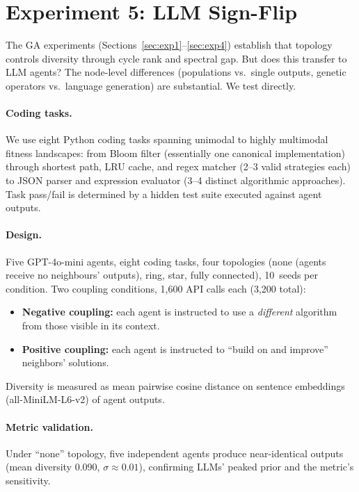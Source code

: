 \documentclass[runningheads]{llncs}
\begin{document}
\section{Experiment 5: LLM Sign-Flip}
\label{sec:exp5}

The GA experiments (Sections~\ref{sec:exp1}--\ref{sec:exp4}) establish
that topology controls diversity through cycle rank and spectral gap.
But does this transfer to LLM agents? The node-level differences
(populations vs.\ single outputs, genetic operators vs.\ language
generation) are substantial. We test directly.

\paragraph{Coding tasks.}
We use eight Python coding tasks spanning unimodal to highly multimodal fitness landscapes: from Bloom filter (essentially one canonical implementation) through shortest path, LRU cache, and regex matcher (2--3 valid strategies each) to JSON parser and expression evaluator (3--4 distinct algorithmic approaches). Task pass/fail is determined by a hidden test suite executed against agent outputs.

\paragraph{Design.}
Five GPT-4o-mini agents, eight coding tasks, four topologies (none
(agents receive no neighbours' outputs), ring, star, fully connected),
10~seeds per condition. Two coupling conditions, 1,600 API calls each
(3,200 total):

\begin{itemize}[nosep]
  \item \textbf{Negative coupling:} each agent is instructed to use a
    \emph{different} algorithm from those visible in its context.
  \item \textbf{Positive coupling:} each agent is instructed to
    ``build on and improve'' neighbors' solutions.
\end{itemize}

\noindent
Diversity is measured as mean pairwise cosine distance on sentence
embeddings (all-MiniLM-L6-v2) of agent outputs.

\paragraph{Metric validation.}
Under ``none'' topology, five independent agents produce
near-identical outputs (mean diversity 0.090, $\sigma \approx 0.01$),
confirming LLMs' peaked prior and the metric's sensitivity.
\end{document}
